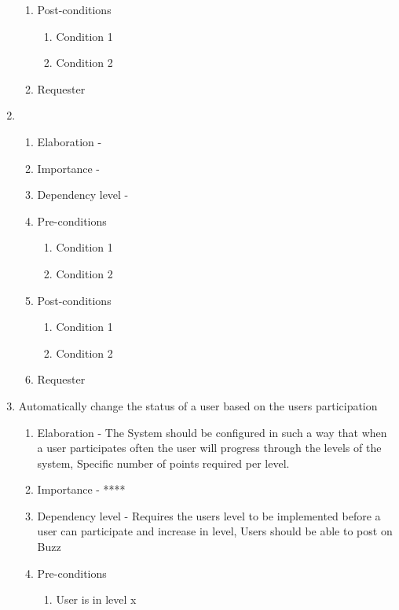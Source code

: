 \documentclass[12pt]{article}
\begin{document}
\begin{enumerate}
\begin{enumerate}
        \item Post-conditions
    \begin{enumerate}
    	\item Condition 1
    	\item Condition 2
    \end{enumerate}
    \item Requester
  \end{enumerate}
\newpage %
   \item  %
  \begin{enumerate}
    \item Elaboration - 
    \item Importance - 
    \item Dependency level - 
    \item Pre-conditions
    \begin{enumerate}
    	\item Condition 1
    	\item Condition 2
    \end{enumerate}
        \item Post-conditions
    \begin{enumerate}
    	\item Condition 1
    	\item Condition 2
    \end{enumerate}
    \item Requester
  \end{enumerate}
\newpage %
   \item Automatically change the status of a user based on the users participation %
  \begin{enumerate}
    \item Elaboration - The System should be configured in such a way that when a user participates often the user will progress through the levels of the system, Specific number of points required per level.
    \item Importance - ****
    \item Dependency level - Requires the users level to be implemented before a user can participate and increase in level, Users should be able to post on Buzz
    \item Pre-conditions
    \begin{enumerate}
    	\item User is in level x

\end{enumerate}
\end{enumerate}
\end{enumerate}
\end{document}
